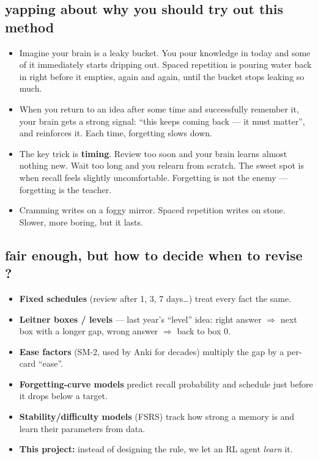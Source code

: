 \subsection{yapping about why you should try out this method}
\begin{itemize}
  \item Imagine your brain is a leaky bucket. You pour knowledge in today and some of it immediately starts
        dripping out. Spaced repetition is pouring water back in right before it empties, again and again, until the
        bucket stops leaking so much.
  \item When you return to an idea after some time and successfully remember it, your brain gets a strong signal:
        ``this keeps coming back --- it must matter'', and reinforces it. Each time, forgetting slows down.
  \item The key trick is \textbf{timing}. Review too soon and your brain learns almost nothing new. Wait too long and
        you relearn from scratch. The sweet spot is when recall feels slightly uncomfortable. Forgetting is not the
        enemy --- forgetting is the teacher.
  \item Cramming writes on a foggy mirror. Spaced repetition writes on stone. Slower, more boring, but it lasts.
\end{itemize}

\subsection{fair enough, but how to decide when to revise ?}
\begin{itemize}
  \item \textbf{Fixed schedules} (review after 1, 3, 7 days\ldots) treat every fact the same.
  \item \textbf{Leitner boxes / levels} --- last year's ``level'' idea: right answer $\Rightarrow$ next box with a longer gap,
        wrong answer $\Rightarrow$ back to box 0.
  \item \textbf{Ease factors} (SM-2, used by Anki for decades) multiply the gap by a per-card ``ease''.
  \item \textbf{Forgetting-curve models} predict recall probability and schedule just before it drops below a target.
  \item \textbf{Stability/difficulty models} (FSRS) track how strong a memory is and learn their parameters from data.
  \item \textbf{This project:} instead of designing the rule, we let an RL agent \emph{learn} it.
\end{itemize}

